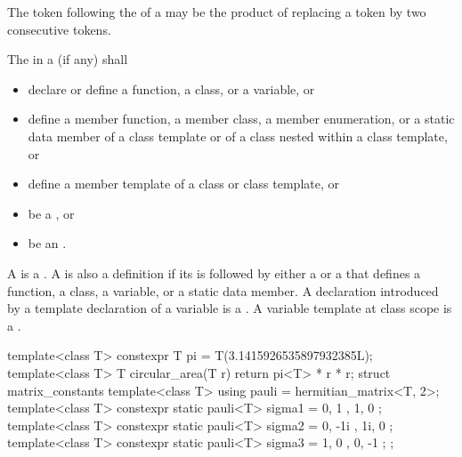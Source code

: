 \begin{note} The \tcode{>} token following the
 of a
may be the product of replacing a
\tcode{>{>}} token by two consecutive \tcode{>}
tokens.\end{note}

\pnum
The
in a
(if any)
shall

\begin{itemize}
\item declare or define a function, a class, or a variable, or

\item define a member function, a member class, a member enumeration, or a static data member of a
class template or of a class nested within a class template, or

\item define a member template of a class or class template, or

\item be a , or

\item be an .
\end{itemize}

\pnum
A  is a .
%
A  is also a definition
if its
 is followed by
either a  or
a  that
defines a function, a class, a variable, or a
static data member. A declaration introduced by a template declaration of a
%
variable is a . A variable template at class scope is a
.

\begin{example}
\begin{codeblock}
template<class T>
  constexpr T pi = T(3.1415926535897932385L);
template<class T>
  T circular_area(T r) {
    return pi<T> * r * r;
  }
struct matrix_constants {
  template<class T>
    using pauli = hermitian_matrix<T, 2>;
  template<class T>
    constexpr static pauli<T> sigma1 = { { 0, 1 }, { 1, 0 } };
  template<class T>
    constexpr static pauli<T> sigma2 = { { 0, -1i }, { 1i, 0 } };
  template<class T>
    constexpr static pauli<T> sigma3 = { { 1, 0 }, { 0, -1 } };
};
\end{codeblock}
\end{example}


